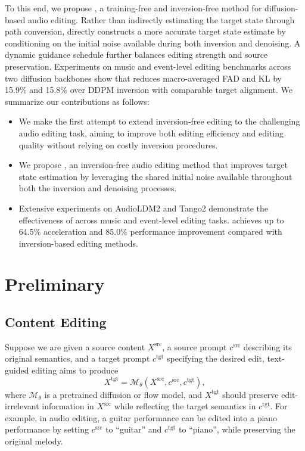 To this end, we propose \ourmethod{}, a training-free and inversion-free method for diffusion-based audio editing.
Rather than indirectly estimating the target state through path conversion, \ourmethod{} directly constructs a more accurate target state estimate by conditioning on the initial noise available during both inversion and denoising.
A dynamic guidance schedule further balances editing strength and source preservation.
Experiments on music and event-level editing benchmarks across two diffusion backbones show that \ourmethod{} reduces macro-averaged FAD and KL by 15.9\% and 15.8\% over DDPM inversion with comparable target alignment. 
We summarize our contributions as follows:
\begin{itemize}
    \item We make the first attempt to extend inversion-free editing to the challenging audio editing task, aiming to improve both editing efficiency and editing quality without relying on costly inversion procedures.

    \item We propose \ourmethod{}, an inversion-free audio editing method that improves target state estimation by leveraging the shared initial noise available throughout both the inversion and denoising processes.

    \item Extensive experiments on AudioLDM2 and Tango2 demonstrate the effectiveness of \ourmethod{} across music and event-level editing tasks. \ourmethod{} achieves up to 64.5\% acceleration and 85.0\% performance improvement compared with inversion-based editing methods.
\end{itemize}

\section{Preliminary}

\subsection{Content Editing}
Suppose we are given a source content $X^{\text{src}}$, a source prompt $c^{\text{src}}$ describing its original semantics, and a target prompt $c^{\text{tgt}}$ specifying the desired edit, text-guided editing aims to produce
\[
X^{\text{tgt}} = \mathcal{M}_\theta(X^{\text{src}}, c^{\text{src}}, c^{\text{tgt}}),
\]
where $ \mathcal{M}_\theta$ is a pretrained diffusion or flow model, and $X^{\text{tgt}}$ should preserve edit-irrelevant information in $X^{\text{src}}$ while reflecting the target semantics in $c^{\text{tgt}}$. 
For example, in audio editing, a guitar performance can be edited into a piano performance by setting $c^{\text{src}}$ to ``guitar'' and $c^{\text{tgt}}$ to ``piano'', while preserving the original melody.

